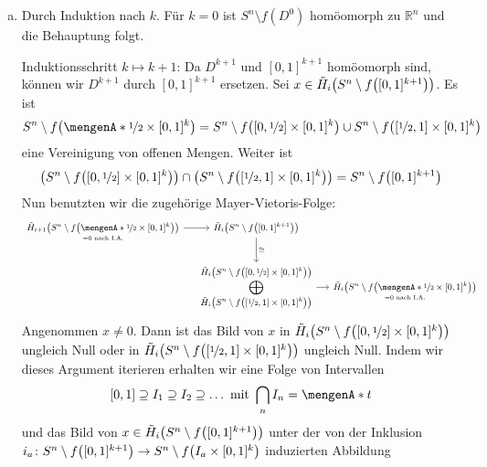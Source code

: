\begin{enumerate}[a)]
	\item Durch Induktion nach $k$. Für $k=0$ ist $S^n \setminus f(D^0)$ homöomorph zu $\mathds{R}^n$ und die Behauptung folgt.
	
	Induktionsschritt $k \mapsto k+1$: Da $D^{k+1}$ und $[0,1]^{k+1}$ homöomorph sind, können wir $D^{k+1}$ durch $[0,1]^{k+1}$ ersetzen. Sei 
	$x \in \tilde{H}_i \enbrace*{S^n \setminus f \enbrace*{[0,1]^{k+1}}}$. Es ist
	\[
		S^n \setminus f \enbrace*{\set{\nicefrac{1}{2}} \times [0,1]^{k}} = S^n \setminus f \enbrace*{\benbrace*{0,\nicefrac{1}{2}}  \times [0,1]^k} \cup S^n \setminus f \enbrace*{\benbrace*{\nicefrac{1}{2},1} \times [0,1]^k}   
	\]
	eine Vereinigung von offenen Mengen. Weiter ist 
	\begin{align*}
		\enbrace*{S^n \setminus f \enbrace*{\benbrace*{0,\nicefrac{1}{2} } \times [0,1]^k} } \cap \enbrace*{S^n \setminus f \enbrace*{\benbrace*{\nicefrac{1}{2} ,1} \times [0,1]^k}} =   S^n \setminus f \enbrace*{[0,1]^{k+1}} 
	\end{align*}
	Nun benutzten wir die zugehörige Mayer-Vietoris-Folge: 
	\[
		\begin{tikzcd}[column sep=1.3em, font=\small]
			\underset{=0 \text{ nach I.A.}}{\tilde{H}_{i+1} \enbrace*{S^n \setminus f \enbrace*{\set{\nicefrac{1}{2}}  \times [0,1]^k}}} \rar &
			\tilde{H}_i \enbrace*{S^n \setminus f \enbrace*{[0,1]^{k+1}} }  \dar["\cong"] & \\
			& {\displaystyle\bigoplus\limits_{\textstyle\tilde{H}_i \enbrace*{S^n \setminus f \enbrace[\big]{[\nicefrac{1}{2},1] \times [0,1]^k} } }
			^{\textstyle\tilde{H}_i \enbrace*{S^n \setminus f \enbrace[\big]{[0,\nicefrac{1}{2}] \times [0,1]^k} } }} \rar &
			\underset{=0 \text{ nach I.A.}}{\tilde{H}_i \enbrace*{S^n \setminus f \enbrace*{\set{\nicefrac{1}{2}} \times [0,1]^k } } }
		\end{tikzcd}
	\]
	Angenommen $x \not=0$. Dann ist das Bild von $x$ in $\tilde{H}_i \enbrace*{S^n \setminus f \enbrace*{[0,\nicefrac{1}{2}] \times [0,1]^k} }$ ungleich Null oder in
	$\tilde{H}_i \enbrace*{S^n \setminus f \enbrace*{[\nicefrac{1}{2},1] \times [0,1]^k}}$ ungleich Null. Indem wir dieses Argument iterieren erhalten wir eine Folge
	von Intervallen
	\[
		[0,1] \supseteq I_1 \supseteq I_2 \supseteq \ldots \text{ mit } \bigcap_n I_n = \set{t} 
	\]
	und das Bild von $x \in \tilde{H}_i \enbrace*{S^n \setminus f \enbrace*{[0,1]^{k+1}}}$ unter der von der Inklusion 
	$i_a \colon S^n \setminus f \enbrace*{[0,1]^{k+1}} \to S^n \setminus f \enbrace*{I_a \times [0,1]^k}$ induzierten Abbildung 

\end{enumerate}
